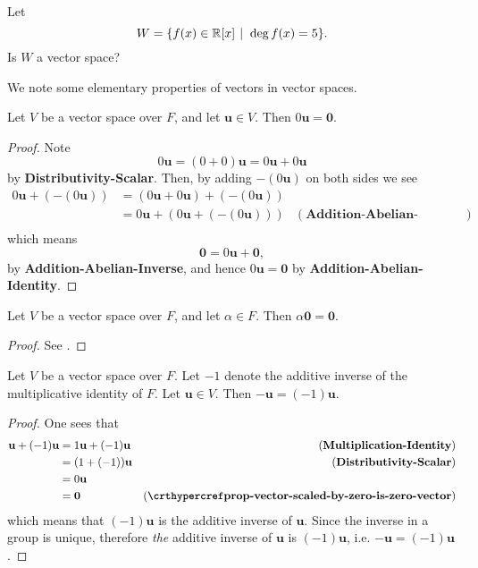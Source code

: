 \begin{exercise}
    Let
    \[
        W = \{f(x) \in \R[x] \vert \deg f(x) = 5\}.
    \]
    Is $W$ a vector space?
\end{exercise}

We note some elementary properties of vectors in vector spaces.
\begin{proposition}\label{prop-vector-scaled-by-zero-is-zero-vector}
    Let $V$ be a vector space over $F$, and let $\textbf{u} \in V$. Then $0\textbf{u} = \textbf{0}$.
\end{proposition}
\begin{proof}
    Note
    \[
        0\textbf{u} = (0 + 0)\textbf{u} = 0\textbf{u} + 0\textbf{u}
    \]
    by \textbf{Distributivity-Scalar}. Then, by adding $-(0\textbf{u})$ on both sides we see
    \begin{align*}
        0\textbf{u} + (-(0\textbf{u})) &= (0\textbf{u} + 0\textbf{u}) + (-(0\textbf{u}))\\
        &= 0\textbf{u} + (0\textbf{u} + (-(0\textbf{u}))) & (\textbf{Addition-Abelian-Associativity})\\
    \end{align*}
    which means
    \[
        \textbf{0} = 0\textbf{u} + \textbf{0},
    \]
    by \textbf{Addition-Abelian-Inverse}, and hence $0\textbf{u} = \textbf{0}$ by \textbf{Addition-Abelian-Identity}.
\end{proof}

\begin{proposition}\label{prop-zero-vector-scaled-by-constant-is-zero-vector}
    Let $V$ be a vector space over $F$, and let $\alpha \in F$. Then $\alpha\textbf{0} = \textbf{0}$.
\end{proposition}
\begin{proof}
    See .
\end{proof}

\begin{proposition}\label{prop-vector-inverse-is-negative-vector}
    Let $V$ be a vector space over $F$. Let $-1$ denote the additive inverse of the multiplicative identity of $F$. Let $\textbf{u} \in V$. Then $-\textbf{u} = (-1)\textbf{u}$.
\end{proposition}
\begin{proof}
    One sees that
    \begin{align*}
        \textbf{u} + (-1)\textbf{u} &= 1\textbf{u} + (-1)\textbf{u} & (\textbf{Multiplication-Identity})\\
        &= (1 + (-1))\textbf{u} & (\textbf{Distributivity-Scalar})\\
        &= 0\textbf{u}\\
        &= \textbf{0} & (\myref{prop-vector-scaled-by-zero-is-zero-vector})
    \end{align*}
    which means that $(-1)\textbf{u}$ is the additive inverse of $\textbf{u}$. Since the inverse in a group is unique, therefore \textit{the} additive inverse of $\textbf{u}$ is $(-1)\textbf{u}$, i.e. $-\textbf{u} = (-1)\textbf{u}$.
\end{proof}

